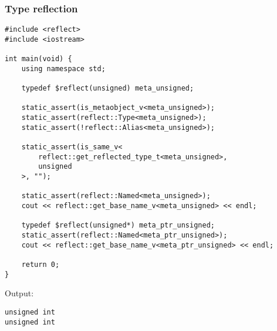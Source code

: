 \subsubsection{Type reflection}

\begin{verbatim}
#include <reflect>
#include <iostream>

int main(void) {
	using namespace std;

	typedef $reflect(unsigned) meta_unsigned;

	static_assert(is_metaobject_v<meta_unsigned>);
	static_assert(reflect::Type<meta_unsigned>);
	static_assert(!reflect::Alias<meta_unsigned>);

	static_assert(is_same_v<
		reflect::get_reflected_type_t<meta_unsigned>,
		unsigned
	>, "");

	static_assert(reflect::Named<meta_unsigned>);
	cout << reflect::get_base_name_v<meta_unsigned> << endl;

	typedef $reflect(unsigned*) meta_ptr_unsigned;
	static_assert(reflect::Named<meta_ptr_unsigned>);
	cout << reflect::get_base_name_v<meta_ptr_unsigned> << endl;

	return 0;
}
\end{verbatim}

Output:

\begin{verbatim}
unsigned int
unsigned int
\end{verbatim}

